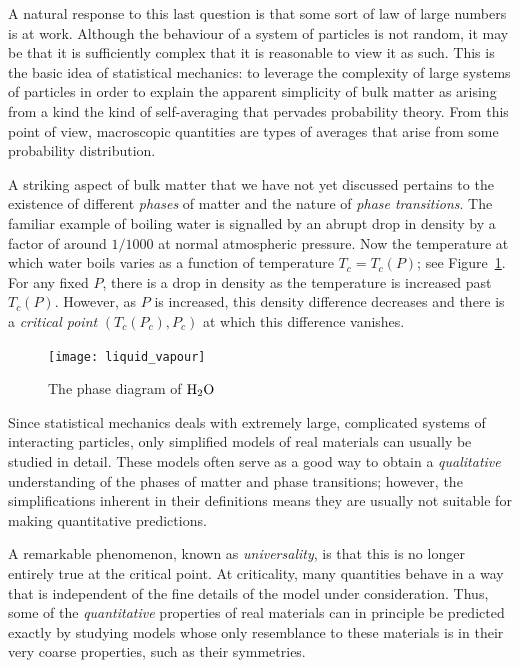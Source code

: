 A natural response to this last question is that some sort of law of large numbers
is at work. Although the behaviour of a system of particles is not random, it may
be that it is sufficiently complex that it is reasonable to view it as such.
This is the basic idea of statistical mechanics: to leverage the complexity of
large systems of particles in order to explain the apparent simplicity of bulk
matter as arising from a kind the kind of self-averaging that pervades probability
theory. From this point of view, macroscopic quantities are types of averages that
arise from some probability distribution.

A striking aspect of bulk matter that we have not yet discussed pertains to the
existence of different \emph{phases} of matter and the nature of \emph{phase transitions}.
The familiar example of boiling water is signalled by an abrupt drop in density by a factor
of around $1/1000$ at normal atmospheric pressure. Now the temperature at which water
boils varies as a function of temperature $T_c = T_c(P)$; see Figure~\ref{fig:liquid-vapour}.
For any fixed $P$, there is a drop in density as the temperature is increased past
$T_c(P)$. However, as $P$ is increased, this density difference decreases and there is
a \emph{critical point} $(T_c(P_c), P_c)$ at which this difference vanishes.

\begin{figure}
\centering
\label{fig:liquid-vapour}
\texttt{[image: liquid\_vapour]}
\caption{The phase diagram of $\rm H_2 O$}
\end{figure}

Since statistical mechanics deals with extremely large, complicated systems of
interacting particles, only simplified models of real materials can usually be
studied in detail. These models often serve as a good way to obtain a
\emph{qualitative} understanding of the phases of matter and phase transitions;
however, the simplifications inherent in their definitions means they are usually
not suitable for making quantitative predictions.

A remarkable phenomenon, known as \emph{universality}, is that this is no longer
entirely true at the critical point. At criticality, many quantities behave in a
way that is independent of the fine details of the model under consideration. Thus,
some of the \emph{quantitative} properties of real materials can in principle be
predicted exactly by studying models whose only resemblance to these materials is
in their very coarse properties, such as their symmetries.

